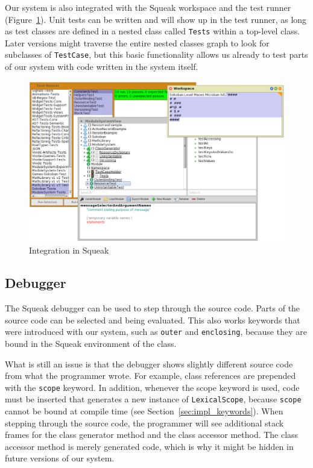 Our system is also integrated with the Squeak workspace and the test runner (Figure~\ref{fig:impl_integration}). Unit tests can be written and will show up in the test runner, as long as test classes are defined in a nested class called \texttt{Tests} within a top-level class. Later versions might traverse the entire nested classes graph to look for subclasses of \texttt{TestCase}, but this basic functionality allows us already to test parts of our system with code written in the system itself.

\begin{figure}[!htp]
	\centering
	\includegraphics[width=\textwidth]{screenshot_integration.png}
	\caption{Integration in Squeak}
	\label{fig:impl_integration}
\end{figure}

\subsection{Debugger}
The Squeak debugger can be used to step through the source code. Parts of the source code can be selected and being evaluated. This also works keywords that were introduced with our system, such as \texttt{outer} and \texttt{enclosing}, because they are bound in the Squeak environment of the class.

What is still an issue is that the debugger shows slightly different source code from what the programmer wrote. For example, class references are prepended with the \texttt{scope} keyword. In addition, whenever the scope keyword is used, code must be inserted that generates a new instance of \texttt{LexicalScope}, because \texttt{scope} cannot be bound at compile time (see Section~\ref{sec:impl_keywords}). When stepping through the source code, the programmer will see additional stack frames for the class generator method and the class accessor method. The class accessor method is merely generated code, which is why it might be hidden in future versions of our system.


